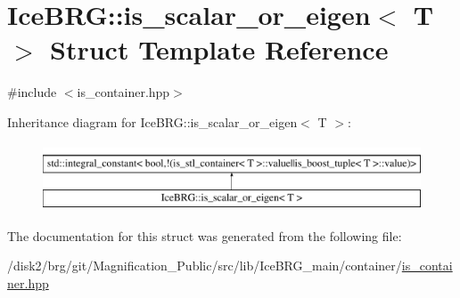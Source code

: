 \hypertarget{structIceBRG_1_1is__scalar__or__eigen}{}\section{Ice\+B\+R\+G\+:\+:is\+\_\+scalar\+\_\+or\+\_\+eigen$<$ T $>$ Struct Template Reference}
\label{structIceBRG_1_1is__scalar__or__eigen}


{\ttfamily \#include $<$is\+\_\+container.\+hpp$>$}

Inheritance diagram for Ice\+B\+R\+G\+:\+:is\+\_\+scalar\+\_\+or\+\_\+eigen$<$ T $>$\+:\begin{figure}[H]
\begin{center}
\leavevmode
\includegraphics[height=2.000000cm]{structIceBRG_1_1is__scalar__or__eigen}
\end{center}
\end{figure}


The documentation for this struct was generated from the following file\+:\begin{DoxyCompactItemize}
\item 
/disk2/brg/git/\+Magnification\+\_\+\+Public/src/lib/\+Ice\+B\+R\+G\+\_\+main/container/\hyperlink{is__container_8hpp}{is\+\_\+container.\+hpp}\end{DoxyCompactItemize}
